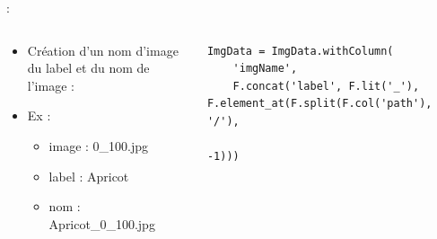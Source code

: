 \documentclass[8pt,aspectratio=169,hyperref={unicode=true}]{beamer}
\begin{document}
\begin{frame}[fragile]{\insertsubsection : \insertsubsubsection}
  \begin{columns}
    \begin{column}{.25\textwidth}
      \begin{itemize}
        \item Création d'un nom d'image du label et du nom de l'image :
        \item Ex :
              \begin{itemize}
                \item image : 0\_100.jpg
                \item label : Apricot
                \item nom : Apricot\_0\_100.jpg
              \end{itemize}
      \end{itemize}
    \end{column}
    \begin{column}{.75\textwidth}
      \begin{verbatim}
ImgData = ImgData.withColumn(
    'imgName',
    F.concat('label', F.lit('_'), F.element_at(F.split(F.col('path'), '/'),
                                               -1)))
      \end{verbatim}
    \end{column}
  \end{columns}
\end{frame}
\end{document}

